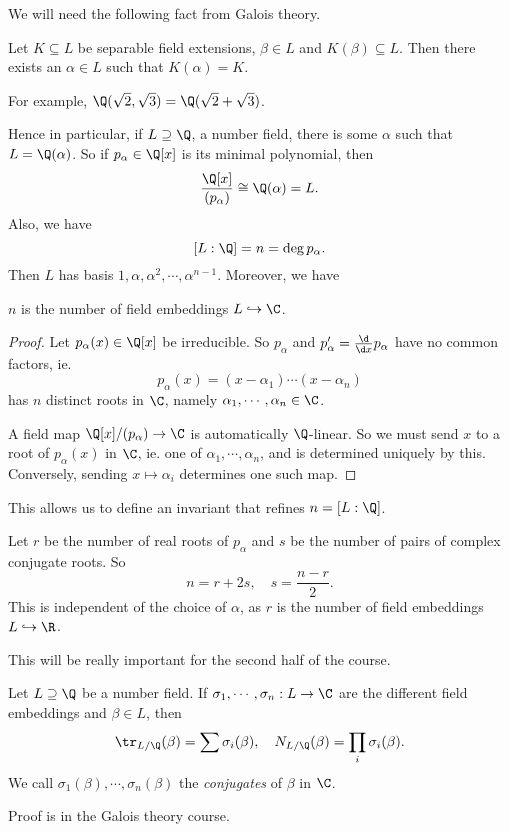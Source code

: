 \documentclass[a4paper]{article}
\begin{document}
We will need the following fact from Galois theory.
\begin{thm}
  Let $K \subseteq L$ be separable field extensions, $\beta \in L$ and $K(\beta) \subseteq L$. Then there exists an $\alpha \in L$ such that $K(\alpha) = K$.
\end{thm}

For example, $\Q(\sqrt{2}, \sqrt{3}) = \Q(\sqrt{2} + \sqrt{3})$.

Hence in particular, if $L \supseteq \Q$, a number field, there is some $\alpha$ such that $L = \Q(\alpha)$. So if $p_\alpha \in \Q[x]$ is its minimal polynomial, then
\[
  \frac{\Q[x]}{(p_\alpha)} \cong \Q(\alpha) = L.
\]
Also, we have
\[
  [L:\Q] = n = \deg p_\alpha.
\]
Then $L$ has basis $1, \alpha, \alpha^2, \cdots, \alpha^{n - 1}$. Moreover, we have
\begin{lemma}
  $n$ is the number of field embeddings $L \hookrightarrow \C$.
\end{lemma}

\begin{proof}
  Let $p_\alpha(x) \in \Q[x]$ be irreducible. So $p_\alpha$ and $p_\alpha' = \frac{\d}{\d x}p_\alpha$ have no common factors, ie.
  \[
    p_\alpha(x) = (x - \alpha_1) \cdots (x - \alpha_n)
  \]
  has $n$ distinct roots in $\C$, namely $\alpha_1, \cdots, \alpha_n \in \C$.

  A field map $\Q[x]/(p_\alpha) \to \C$ is automatically $\Q$-linear. So we must send $x$ to a root of $p_\alpha(x)$ in $\C$, ie. one of $\alpha_1, \cdots, \alpha_n$, and is determined uniquely by this. Conversely, sending $x \mapsto \alpha_i$ determines one such map.
\end{proof}

This allows us to define an invariant that refines $n = [L:\Q]$.

\begin{defi}[$r$ and $s$]
  Let $r$ be the number of real roots of $p_\alpha$ and $s$ be the number of pairs of complex conjugate roots. So
  \[
    n = r + 2s,\quad s = \frac{n - r}{2}.
  \]
  This is independent of the choice of $\alpha$, as $r$ is the number of field embeddings $L \hookrightarrow \R$.
\end{defi}
This will be really important for the second half of the course.

\begin{cor}
  Let $L \supseteq \Q$ be a number field. If $\sigma_1, \cdots, \sigma_n:L \to \C$ are the different field embeddings and $\beta \in L$, then
  \[
    \tr_{L/\Q}(\beta) = \sum \sigma_i(\beta),\quad N_{L/\Q}(\beta) = \prod_i \sigma_i(\beta).
  \]
  We call $\sigma_1(\beta), \cdots, \sigma_n (\beta)$ the \emph{conjugates} of $\beta$ in $\C$.
\end{cor}
Proof is in the Galois theory course.
\end{document}
